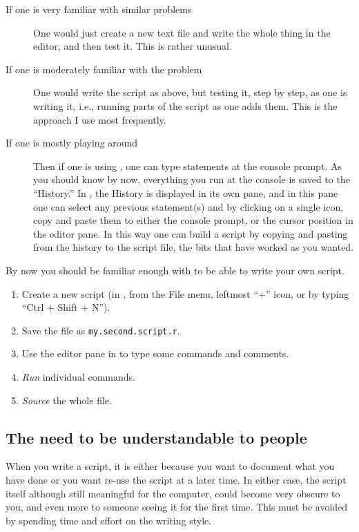 \begin{playground}
\begin{description}
\item[If one is very familiar with similar problems] One would just create a new text file and write the whole thing in the editor, and then test it. This is rather unusual.
\item[If one is moderately familiar with the problem] One would write the script as above, but testing it, step by step, as one is writing it, i.e., running parts of the script as one adds them. This is the approach I use most frequently.
\item[If one is mostly playing around] Then if one is using \RStudio, one can type statements at the console prompt. As you should know by now, everything you run at the console is saved to the ``History.'' In \RStudio, the History is displayed in its own pane, and in this pane one can select any previous statement(s) and by clicking on a single icon, copy and paste them to either the \Rlang console prompt, or the cursor position in the editor pane. In this way one can build a script by copying and pasting from the history to the script file, the bits that have worked as you wanted.
\end{description}

\begin{playground}
By now you should be familiar enough with \Rlang to be able to write your own script.
\begin{enumerate}
  \item Create a new \Rpgrm script (in \RStudio, from the File menu, leftmost ``+'' icon, or by typing ``Ctrl + Shift + N'').
  \item Save the file as \texttt{my.second.script.r}.
  \item Use the editor pane in \RStudio to type some \Rpgrm commands and comments.
  \item \emph{Run} individual commands.
  \item \emph{Source} the whole file.
\end{enumerate}
\end{playground}

\subsection{The need to be understandable to people}\label{sec:script:readability}

When you write a script, it is either because you want to document what you have done or you want re-use the script at a later time. In either case, the script itself although still meaningful for the computer, could become very obscure to you, and even more to someone seeing it for the first time. This must be avoided by spending time and effort on the writing style.


\end{playground}
